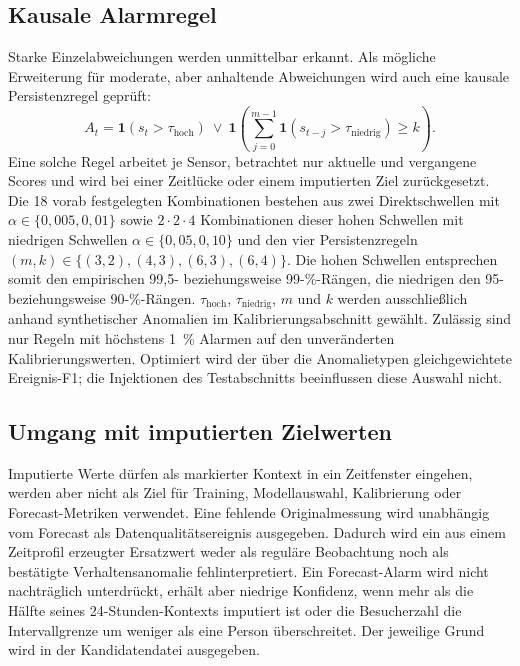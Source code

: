 \subsection{Kausale Alarmregel}

Starke Einzelabweichungen werden unmittelbar erkannt. Als mögliche Erweiterung
für moderate, aber anhaltende Abweichungen wird auch eine kausale
Persistenzregel geprüft:
\begin{equation}
 A_t=\mathbf{1}(s_t>\tau_{\mathrm{hoch}})\ \lor\
 \mathbf{1}\!\left(
 \sum_{j=0}^{m-1}\mathbf{1}(s_{t-j}>\tau_{\mathrm{niedrig}})\geq k
 \right).
\end{equation}
Eine solche Regel arbeitet je Sensor, betrachtet nur aktuelle und vergangene Scores
und wird bei einer Zeitlücke oder einem imputierten Ziel zurückgesetzt. Die 18
vorab festgelegten Kombinationen bestehen aus zwei Direktschwellen mit
$\alpha\in\{0{,}005,0{,}01\}$ sowie $2\cdot2\cdot4$ Kombinationen dieser
hohen Schwellen mit niedrigen Schwellen
$\alpha\in\{0{,}05,0{,}10\}$ und den vier Persistenzregeln
$(m,k)\in\{(3,2),(4,3),(6,3),(6,4)\}$. Die hohen Schwellen entsprechen somit
den empirischen 99{,}5- beziehungsweise 99-\%-Rängen, die niedrigen den
95- beziehungsweise 90-\%-Rängen. $\tau_{\mathrm{hoch}}$,
$\tau_{\mathrm{niedrig}}$, $m$ und $k$ werden ausschließlich anhand
synthetischer Anomalien im Kalibrierungsabschnitt gewählt. Zulässig sind nur
Regeln mit
höchstens 1~\% Alarmen auf den unveränderten Kalibrierungswerten. Optimiert wird
der über die Anomalietypen gleichgewichtete Ereignis-F1; die Injektionen des
Testabschnitts beeinflussen diese Auswahl nicht.

\subsection{Umgang mit imputierten Zielwerten}

Imputierte Werte dürfen als markierter Kontext in ein Zeitfenster eingehen,
werden aber nicht als Ziel für Training, Modellauswahl, Kalibrierung oder
Forecast-Metriken verwendet. Eine fehlende Originalmessung wird unabhängig vom
Forecast als Datenqualitätsereignis ausgegeben. Dadurch wird ein aus einem
Zeitprofil erzeugter Ersatzwert weder als reguläre Beobachtung noch als
bestätigte Verhaltensanomalie fehlinterpretiert.
Ein Forecast-Alarm wird nicht nachträglich unterdrückt, erhält aber niedrige
Konfidenz, wenn mehr als die Hälfte seines 24-Stunden-Kontexts
imputiert ist oder die Besucherzahl die Intervallgrenze um weniger als eine
Person überschreitet. Der jeweilige Grund wird in der Kandidatendatei
ausgegeben.

